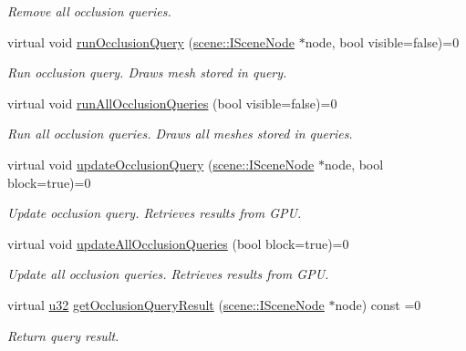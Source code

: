\begin{DoxyCompactItemize}
\begin{DoxyCompactList}\small\item\em Remove all occlusion queries. \end{DoxyCompactList}\item 
virtual void \hyperlink{classirr_1_1video_1_1IVideoDriver_aaf92a35268dad06996c4f5edabec249f}{run\+Occlusion\+Query} (\hyperlink{classirr_1_1scene_1_1ISceneNode}{scene\+::\+I\+Scene\+Node} $\ast$node, bool visible=false)=0
\begin{DoxyCompactList}\small\item\em Run occlusion query. Draws mesh stored in query. \end{DoxyCompactList}\item 
virtual void \hyperlink{classirr_1_1video_1_1IVideoDriver_ae2ba500924a7d74fe74dd4724b737628}{run\+All\+Occlusion\+Queries} (bool visible=false)=0
\begin{DoxyCompactList}\small\item\em Run all occlusion queries. Draws all meshes stored in queries. \end{DoxyCompactList}\item 
virtual void \hyperlink{classirr_1_1video_1_1IVideoDriver_a626061128fcf018516c6d931bd616ea7}{update\+Occlusion\+Query} (\hyperlink{classirr_1_1scene_1_1ISceneNode}{scene\+::\+I\+Scene\+Node} $\ast$node, bool block=true)=0
\begin{DoxyCompactList}\small\item\em Update occlusion query. Retrieves results from G\+PU. \end{DoxyCompactList}\item 
virtual void \hyperlink{classirr_1_1video_1_1IVideoDriver_ab611513a8cdb3cc62c29b864de0d1de7}{update\+All\+Occlusion\+Queries} (bool block=true)=0
\begin{DoxyCompactList}\small\item\em Update all occlusion queries. Retrieves results from G\+PU. \end{DoxyCompactList}\item 
virtual \hyperlink{namespaceirr_a0416a53257075833e7002efd0a18e804}{u32} \hyperlink{classirr_1_1video_1_1IVideoDriver_a149ea92e04b2d0fe18bf5b584ccf6de4}{get\+Occlusion\+Query\+Result} (\hyperlink{classirr_1_1scene_1_1ISceneNode}{scene\+::\+I\+Scene\+Node} $\ast$node) const =0
\begin{DoxyCompactList}\small\item\em Return query result. \end{DoxyCompactList}\item 

\end{DoxyCompactItemize}
